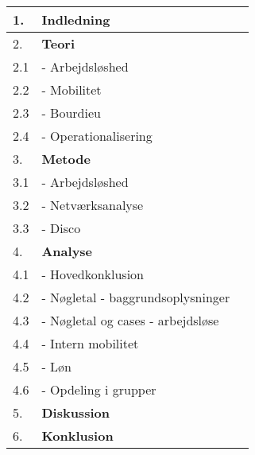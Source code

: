 \begin{table}[h] 
\begin{tabular}{@{}||l||l||l||@{}} \hline \hline
  1.  & \textbf{Indledning} & \\ \hline \hline 
  2.  & \textbf{Teori} & \\ 
  2.1 & - Arbejdsløshed & \\ 
  2.2 & - Mobilitet & \\ 
  2.3 & - Bourdieu & \\ 
  2.4 & - Operationalisering & \\ \hline \hline 
  3.  & \textbf{Metode} & \\ 
  3.1 & - Arbejdsløshed & \\ 
  3.2 & - Netværksanalyse & \\ 
  3.3 & - Disco & \\ \hline \hline 
  4.  & \textbf{Analyse} & \\ 
  4.1 & - Hovedkonklusion & \\ 
  4.2 & - Nøgletal - baggrundsoplysninger & \\ 
  4.3 & - Nøgletal og cases - arbejdsløse & \\ 
  4.4 & - Intern mobilitet & \\ 
  4.5 & - Løn & \\ 
  4.6 & - Opdeling i grupper & \\ \hline \hline
  5.  & \textbf{Diskussion}  & \\ \hline \hline 
  6.  & \textbf{Konklusion} & \\ \hline \hline 
\end{tabular} \end{table}




